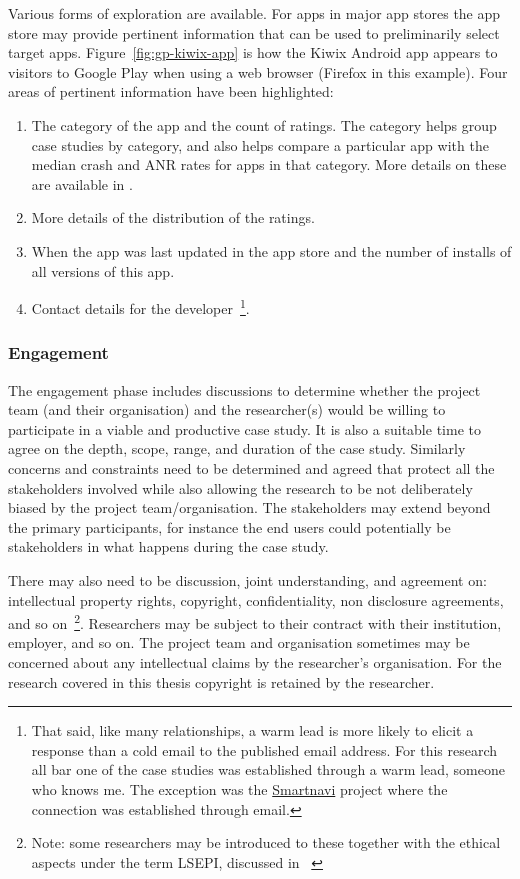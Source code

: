 Various forms of exploration are available. For apps in major app stores the app store may provide pertinent information that can be used to preliminarily select target apps. Figure~\ref{fig:gp-kiwix-app} is how the Kiwix Android app appears to visitors to Google Play when using a web browser (Firefox in this example). Four areas of pertinent information have been highlighted:

\begin{enumerate}[label=(\alph*)]
    \itemsep0em
    \item The category of the app and the count of ratings. The category helps group case studies by category, and also helps compare a particular app with the median crash and ANR rates for apps in that category. More details on these are available in .
    \item More details of the distribution of the ratings.
    \item When the app was last updated in the app store and the number of installs of all versions of this app.
    \item Contact details for the developer~\footnote{That said, like many relationships, a warm lead is more likely to elicit a response than a cold email to the published email address. For this research all bar one of the case studies was established through a warm lead, someone who knows me. The exception was the \href{https://github.com/Phantast/smartnavi}{Smartnavi} project where the connection was established through email.}.
\end{enumerate}


\subsubsection{Engagement}
The engagement phase includes discussions to determine whether the project team (and their organisation) and the researcher(s) would be willing to participate in a viable and productive case study. It is also a suitable time to agree on the depth, scope, range, and duration of the case study. Similarly concerns and constraints need to be determined and agreed that protect all the stakeholders involved while also allowing the research to be not deliberately biased by the project team/organisation. The stakeholders may extend beyond the primary participants, for instance the end users could potentially be stakeholders in what happens during the case study.

There may also need to be discussion, joint understanding, and agreement on: intellectual property rights, copyright, confidentiality, non disclosure agreements, and so on~\footnote{Note: some researchers may be introduced to these together with the ethical aspects under the term LSEPI, discussed in ~\citet{brooke2018__becoming_professional_a_university_perspective}}. Researchers may be subject to their contract with their institution, employer, and so on. The project team and organisation sometimes may be concerned about any intellectual claims by the researcher's organisation. For the research covered in this thesis copyright is retained by the researcher.

